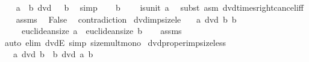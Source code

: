\begin{isabellebody}
\ \ \isamarkupfalse%
\ {\isachardoublequoteopen}a\ {\isacharasterisk}{\kern0pt}\ b\ dvd\ {}\ {\isacharasterisk}{\kern0pt}\ b{\isachardoublequoteclose}\ \isamarkupfalse%
\ simp\isanewline
\ \ \isamarkupfalse%
\ {\isacartoucheopen}b\ {\isasymnoteq}\ {}{\isacartoucheclose}\ \isamarkupfalse%
\ {\isachardoublequoteopen}is{\isacharunderscore}{\kern0pt}unit\ a{\isachardoublequoteclose}\ \isamarkupfalse%
\ {\isacharparenleft}{\kern0pt}subst\ {\isacharparenleft}{\kern0pt}asm{\isacharparenright}{\kern0pt}\ dvd{\isacharunderscore}{\kern0pt}times{\isacharunderscore}{\kern0pt}right{\isacharunderscore}{\kern0pt}cancel{\isacharunderscore}{\kern0pt}iff{\isacharparenright}{\kern0pt}\isanewline
\ \ \isamarkupfalse%
\ assms{\isacharparenleft}{\kern0pt}{}{\isacharparenright}{\kern0pt}\ \isamarkupfalse%
\ False\ \isamarkupfalse%
\ contradiction\isanewline
{}\isamarkupfalse%
%
\endisatagproof
{\isafoldproof}%
%
\isadelimproof
\isanewline
%
\endisadelimproof
\isanewline
{}\isamarkupfalse%
\ dvd{\isacharunderscore}{\kern0pt}imp{\isacharunderscore}{\kern0pt}size{\isacharunderscore}{\kern0pt}le{\isacharcolon}{\kern0pt}\isanewline
\ \ \ {\isachardoublequoteopen}a\ dvd\ b{\isachardoublequoteclose}\ {\isachardoublequoteopen}b\ {\isasymnoteq}\ {}{\isachardoublequoteclose}\ \isanewline
\ \ \ \ \ {\isachardoublequoteopen}euclidean{\isacharunderscore}{\kern0pt}size\ a\ {\isasymle}\ euclidean{\isacharunderscore}{\kern0pt}size\ b{\isachardoublequoteclose}\isanewline
%
\isadelimproof
\ \ %
\endisadelimproof
%
\isatagproof
{}\isamarkupfalse%
\ assms\ \isamarkupfalse%
\ {\isacharparenleft}{\kern0pt}auto\ elim{\isacharbang}{\kern0pt}{\isacharcolon}{\kern0pt}\ dvdE\ simp{\isacharcolon}{\kern0pt}\ size{\isacharunderscore}{\kern0pt}mult{\isacharunderscore}{\kern0pt}mono{\isacharparenright}{\kern0pt}%
\endisatagproof
{\isafoldproof}%
%
\isadelimproof
\isanewline
%
\endisadelimproof
\isanewline
{}\isamarkupfalse%
\ dvd{\isacharunderscore}{\kern0pt}proper{\isacharunderscore}{\kern0pt}imp{\isacharunderscore}{\kern0pt}size{\isacharunderscore}{\kern0pt}less{\isacharcolon}{\kern0pt}\isanewline
\ \ \ {\isachardoublequoteopen}a\ dvd\ b{\isachardoublequoteclose}\ {\isachardoublequoteopen}{\isasymnot}\ b\ dvd\ a{\isachardoublequoteclose}\ {\isachardoublequoteopen}b\ {\isasymnoteq}\ {}{\isachardoublequoteclose}\ \isanewline

\end{isabellebody}
